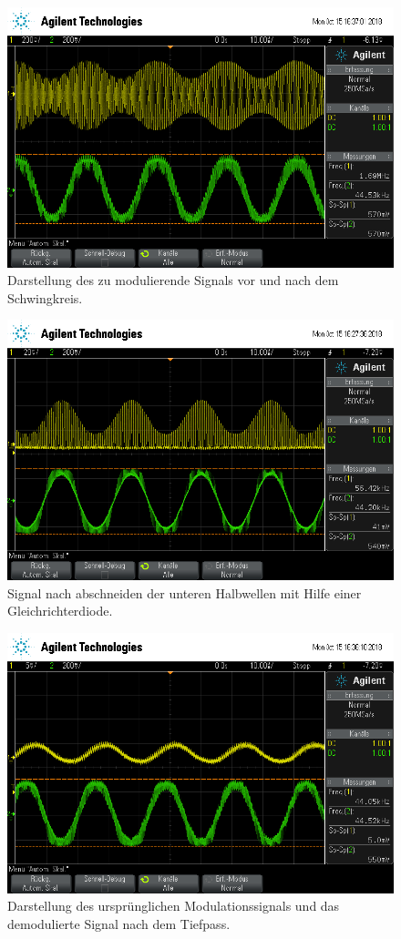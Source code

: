 \begin{figure}
  \centering
  \includegraphics[width=0.7\linewidth]{ressources/scope_468.png}
  \caption{Darstellung des zu modulierende Signals vor und nach dem Schwingkreis.}
  \label{fmd}
\end{figure}
\begin{figure}
  \centering
  \includegraphics[width=0.7\linewidth]{ressources/scope_464.png}
  \caption{Signal nach abschneiden der unteren Halbwellen mit Hilfe einer Gleichrichterdiode.}
  \label{halb}
\end{figure}
\begin{figure}
  \centering
  \includegraphics[width=0.7\linewidth]{ressources/scope_467.png}
  \caption{Darstellung des ursprünglichen Modulationssignals und das demodulierte Signal nach dem Tiefpass.}
  \label{ntp2}
\end{figure}


